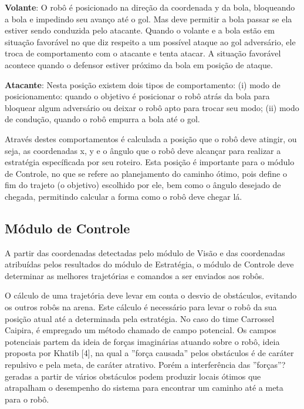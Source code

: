 {\bf Volante}: O rob{\^o} {\'e} posicionado na dire{\c c}{\~a}o da coordenada y
da bola, bloqueando a bola e impedindo seu avan{\c c}o at{\'e} o gol.
Mas deve permitir a bola passar se ela estiver sendo conduzida
pelo atacante. Quando o volante e a bola est{\~a}o em situa{\c c}{\~a}o
favor{\'a}vel no que diz respeito a um poss{\'i}vel ataque ao gol
advers{\'a}rio, ele troca de comportamento com o atacante e tenta
atacar. A situa{\c c}{\~a}o favor{\'a}vel acontece quando o defensor
estiver pr{\'o}ximo da bola em posi{\c c}{\~a}o de ataque.

{\bf Atacante}: Nesta posi{\c c}{\~a}o existem dois tipos de
comportamento: (i) modo de posicionamento: quando o
objetivo {\'e} posicionar o rob{\^o} atr{\'a}s da bola para bloquear algum
advers{\'a}rio ou deixar o rob{\^o} apto para trocar seu modo; (ii)
modo de condu{\c c}{\~a}o, quando o rob{\^o} empurra a bola at{\'e} o gol.

Atrav{\'e}s destes comportamentos {\'e} calculada a posi{\c c}{\~a}o que o
rob{\^o} deve atingir, ou seja, as coordenadas x, y e o {\^a}ngulo que o
rob{\^o} deve alcan{\c c}ar para realizar a estrat{\'e}gia espec{\'i}ficada por seu roteiro.
Esta posi{\c c}{\~a}o {\'e} importante para o m{\'o}dulo de Controle, no que se
refere ao planejamento do caminho {\'o}timo, pois define o fim do
trajeto (o objetivo) escolhido por ele, bem como o {\^a}ngulo desejado de chegada, permitindo
calcular a forma como o rob{\^o} deve chegar l{\'a}.

\subsection{M{\'o}dulo de Controle}

A partir das coordenadas detectadas pelo m{\'o}dulo de Vis{\~a}o
e das coordenadas atribu{\'i}das pelos resultados do m{\'o}dulo de
Estrat{\'e}gia, o m{\'o}dulo de Controle deve determinar as melhores
trajet{\'o}rias e comandos a ser enviados aos rob{\^o}s.

O c{\'a}lculo de uma trajet{\'o}ria deve levar em conta o desvio de
obst{\'a}culos, evitando os outros rob{\^o}s na arena. Este c{\'a}lculo {\'e}
necess{\'a}rio para levar o rob{\^o} da sua posi{\c c}{\~a}o atual at{\'e} a
determinada pela estrat{\'e}gia. No caso do time Carrossel Caipira,
{\'e} empregado um m{\'e}todo chamado de campo potencial. Os
campos potenciais partem da ideia de for{\c c}as imagin{\'a}rias
atuando sobre o rob{\^o}, ideia proposta por Khatib [4], na qual a
''for{\c c}a causada'' pelos obst{\'a}culos {\'e} de car{\'a}ter repulsivo e pela
meta, de car{\'a}ter atrativo. Por{\'e}m a interfer{\^e}ncia das ''for{\c c}as''?
geradas a partir de v{\'a}rios obst{\'a}culos podem produzir locais
{\'o}timos que atrapalham o desempenho do sistema para
encontrar um caminho at{\'e} a meta para o rob{\^o}.


